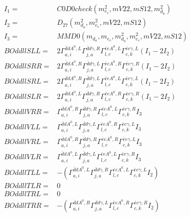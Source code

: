 \documentclass[A4,landscape]{article}
\begin{document}
\begin{align} 
I_1 = & C0D0check(m^2_{e_{{c}}}, mV22, mS12, m^2_{d_{{a}}}) \\ 
I_2 = & D_{27}(m^2_{d_{{a}}}, m^2_{e_{{c}}}, mV22, mS12) \\ 
I_3 = & MMD0(m_{d_{{a}}}, m_{e_{{c}}}, m^2_{d_{{a}}}, m^2_{e_{{c}}}, mV22, mS12) \\ 
  BOddllSLL= & 2  \Gamma^{\bar{d}d A^0 ,L}_{a, i} \Gamma^{\bar{d}d \gamma ,R}_{j, a} \Gamma^{\bar{e}e A^0 ,L}_{l, c} \Gamma^{\bar{e}e \gamma ,L}_{c, k} (I_1 - 2 I_2) \\ 
  BOddllSRR= & 2  \Gamma^{\bar{d}d A^0 ,R}_{a, i} \Gamma^{\bar{d}d \gamma ,L}_{j, a} \Gamma^{\bar{e}e A^0 ,R}_{l, c} \Gamma^{\bar{e}e \gamma ,R}_{c, k} (I_1 - 2 I_2) \\ 
  BOddllSRL= & 2  \Gamma^{\bar{d}d A^0 ,R}_{a, i} \Gamma^{\bar{d}d \gamma ,L}_{j, a} \Gamma^{\bar{e}e A^0 ,L}_{l, c} \Gamma^{\bar{e}e \gamma ,L}_{c, k} (I_1 - 2 I_2) \\ 
  BOddllSLR= & 2  \Gamma^{\bar{d}d A^0 ,L}_{a, i} \Gamma^{\bar{d}d \gamma ,R}_{j, a} \Gamma^{\bar{e}e A^0 ,R}_{l, c} \Gamma^{\bar{e}e \gamma ,R}_{c, k} (I_1 - 2 I_2) \\ 
  BOddllVRR= &  \Gamma^{\bar{d}d A^0 ,R}_{a, i} \Gamma^{\bar{d}d \gamma ,R}_{j, a} \Gamma^{\bar{e}e A^0 ,L}_{l, c} \Gamma^{\bar{e}e \gamma ,R}_{c, k} I_3 \\ 
  BOddllVLL= &  \Gamma^{\bar{d}d A^0 ,L}_{a, i} \Gamma^{\bar{d}d \gamma ,L}_{j, a} \Gamma^{\bar{e}e A^0 ,R}_{l, c} \Gamma^{\bar{e}e \gamma ,L}_{c, k} I_3 \\ 
  BOddllVRL= &  \Gamma^{\bar{d}d A^0 ,R}_{a, i} \Gamma^{\bar{d}d \gamma ,R}_{j, a} \Gamma^{\bar{e}e A^0 ,R}_{l, c} \Gamma^{\bar{e}e \gamma ,L}_{c, k} I_3 \\ 
  BOddllVLR= &  \Gamma^{\bar{d}d A^0 ,L}_{a, i} \Gamma^{\bar{d}d \gamma ,L}_{j, a} \Gamma^{\bar{e}e A^0 ,L}_{l, c} \Gamma^{\bar{e}e \gamma ,R}_{c, k} I_3 \\ 
  BOddllTLL= & -( \Gamma^{\bar{d}d A^0 ,L}_{a, i} \Gamma^{\bar{d}d \gamma ,R}_{j, a} \Gamma^{\bar{e}e A^0 ,L}_{l, c} \Gamma^{\bar{e}e \gamma ,L}_{c, k} I_2) \\ 
  BOddllTLR= & 0 \\ 
  BOddllTRL= & 0 \\ 
  BOddllTRR= & -( \Gamma^{\bar{d}d A^0 ,R}_{a, i} \Gamma^{\bar{d}d \gamma ,L}_{j, a} \Gamma^{\bar{e}e A^0 ,R}_{l, c} \Gamma^{\bar{e}e \gamma ,R}_{c, k} I_2) \\ 
\end{align} 
\end{document}
